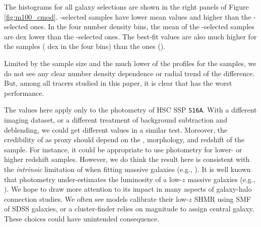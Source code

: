 \documentclass[fleqn,usenatbib,useAMS,english]{mnras}
\begin{document}
    The \mvir{} histograms for all galaxy selections are shown in the right panels of
    Figure \ref{fig:m100_cmod}.
    \mcmodel{}-selected samples have lower mean \mvir{} values and higher \sigmh{}
    than the -selected ones.
    In the four number density bins, the mean \mvir{} of the \mcmodel{}-selected samples are
    \todo{[XX, XX, XX, XX]} dex lower than the -selected ones.
    The best-fit \sigmh{} values are also much higher for the \mcmodel{} samples
    (\todo{[0.6, 0.6, 0.6, 0.7]} dex in the four bins) than the  ones
    (\todo{[0.4, 0.4, 0.4, 0.4]}).

    Limited by the sample size and the much lower \snratio{} of the \dsigma{} profiles
    for the \mcmodel{} samples, we do not see any clear number density dependence or radial
    trend of the difference.
    But, among all tracers studied in this paper, it is clear that \mcmodel{} has the worst
    performance.

    The \sigmh{} values here apply only to the \cmodel{} photometry of HSC SSP \texttt{S16A}.
    With a different imaging dataset, or a different treatment of background subtraction and
    deblending, we could get different \sigmh{} values in a similar test.
    Moreover, the credibility of \mcmodel{} as \mvir{} proxy should depend on the \mstar{},
    morphology, and redshift of the sample.
    For instance, it could be appropriate to use \cmodel{} photometry for lower-\mstar{} or
    higher redshift samples.
    However, we do think the result here is consistent with the \emph{intrinsic} limitation of
    \cmodel{} when fitting massive galaxies (e.g., \addref{}).
    It is well known that \cmodel{} photometry under-estimates the luminosity of a low-$z$
    massive galaxies (e.g., \addref{}).
    We hope to draw more attention to its impact in many aspects of galaxy-halo connection
    studies.
    We often see models calibrate their low-$z$ SHMR using \cmodel{} SMF of SDSS galaxies, or a
    cluster-finder relies on \cmodel{} magnitude to assign central galaxy. These choices could
    have unintended consequence.
\end{document}
